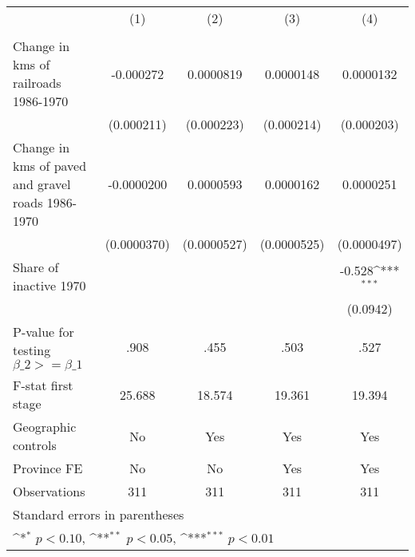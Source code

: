 {
\def\sym#1{\ifmmode^{#1}\else\(^{#1}\)\fi}
\begin{tabular}{l*{4}{c}}
\hline\hline
                &\multicolumn{1}{c}{(1)}&\multicolumn{1}{c}{(2)}&\multicolumn{1}{c}{(3)}&\multicolumn{1}{c}{(4)}\\
                &\multicolumn{1}{c}{}&\multicolumn{1}{c}{}&\multicolumn{1}{c}{}&\multicolumn{1}{c}{}\\
\hline
Change in kms of railroads 1986-1970&-0.000272         &0.0000819         &0.0000148         &0.0000132         \\
                &(0.000211)         &(0.000223)         &(0.000214)         &(0.000203)         \\
[1em]
Change in kms of paved and gravel roads 1986-1970&-0.0000200         &0.0000593         &0.0000162         &0.0000251         \\
                &(0.0000370)         &(0.0000527)         &(0.0000525)         &(0.0000497)         \\
[1em]
Share of inactive 1970&                  &                  &                  &   -0.528\sym{***}\\
                &                  &                  &                  & (0.0942)         \\
\hline
P-value for testing $\beta\_{2} >= \beta\_{1}$&     .908         &     .455         &     .503         &     .527         \\
F-stat first stage&   25.688         &   18.574         &   19.361         &   19.394         \\
Geographic controls&       No         &      Yes         &      Yes         &      Yes         \\
Province FE     &       No         &       No         &      Yes         &      Yes         \\
Observations    &      311         &      311         &      311         &      311         \\
\hline\hline
\multicolumn{5}{l}{\footnotesize Standard errors in parentheses}\\
\multicolumn{5}{l}{\footnotesize \sym{*} \(p<0.10\), \sym{**} \(p<0.05\), \sym{***} \(p<0.01\)}\\
\end{tabular}
}
